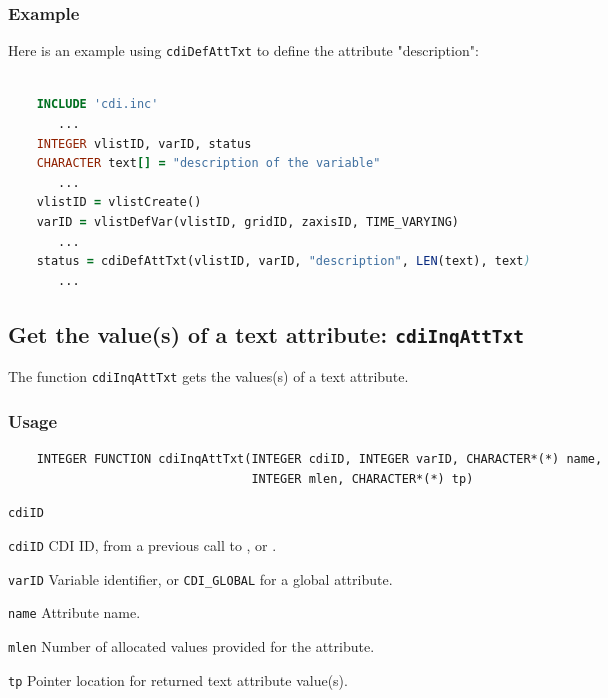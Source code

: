 \subsubsection*{Example}

Here is an example using {\texttt{cdiDefAttTxt}} to define the attribute "description":

\begin{lstlisting}[language=Fortran, backgroundcolor=\color{pyellow}, basicstyle=\small, columns=flexible]

    INCLUDE 'cdi.inc'
       ...
    INTEGER vlistID, varID, status
    CHARACTER text[] = "description of the variable"
       ...
    vlistID = vlistCreate()
    varID = vlistDefVar(vlistID, gridID, zaxisID, TIME_VARYING)
       ...
    status = cdiDefAttTxt(vlistID, varID, "description", LEN(text), text)
       ...
\end{lstlisting}


\subsection{Get the value(s) of a text attribute: \texttt{cdiInqAttTxt}}
\label{cdiInqAttTxt}

The function {\texttt{cdiInqAttTxt}} gets the values(s) of a text attribute.

\subsubsection*{Usage}

\begin{verbatim}
    INTEGER FUNCTION cdiInqAttTxt(INTEGER cdiID, INTEGER varID, CHARACTER*(*) name, 
                                  INTEGER mlen, CHARACTER*(*) tp)
\end{verbatim}

\hspace*{4mm}\begin{minipage}[]{15cm}
\begin{deflist}{\texttt{cdiID}\ }
\item[\texttt{cdiID}]
CDI ID, from a previous call to {}, {} or {}.
\item[\texttt{varID}]
Variable identifier, or {\texttt{CDI\_GLOBAL}} for a global attribute.
\item[\texttt{name}]
Attribute name.
\item[\texttt{mlen}]
Number of allocated values provided for the attribute.
\item[\texttt{tp}]
Pointer location for returned text attribute value(s).

\end{deflist}
\end{minipage}


